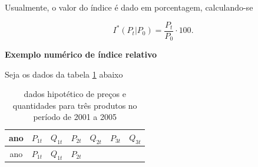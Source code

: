 \documentclass[
]{book}
\begin{document}
Usualmente, o valor do índice é dado em porcentagem, calculando-se

\begin{equation}
  I^*(P_t| P_0) = \frac{P_t}{P_0}\cdot 100.
  \label{eq:IndicePrecoRelativoPorcentagem}
\end{equation}

\textbf{Exemplo numérico de índice relativo}

Seja os dados da tabela \ref{tab:DadosPrecosQuantidadesDeTresProdutos2001a2005} abaixo

\begin{longtable}[]{@{}ccccccc@{}}
\caption{\label{tab:DadosPrecosQuantidadesDeTresProdutos2001a2005} dados hipotético de preços e quantidades para três produtos no período de 2001 a 2005}\tabularnewline
\toprule
\begin{minipage}[b]{0.08\columnwidth}\centering
ano\strut
\end{minipage} & \begin{minipage}[b]{0.12\columnwidth}\centering
\(P_{1t}\)\strut
\end{minipage} & \begin{minipage}[b]{0.12\columnwidth}\centering
\(Q_{1t}\)\strut
\end{minipage} & \begin{minipage}[b]{0.12\columnwidth}\centering
\(P_{2t}\)\strut
\end{minipage} & \begin{minipage}[b]{0.12\columnwidth}\centering
\(Q_{2t}\)\strut
\end{minipage} & \begin{minipage}[b]{0.12\columnwidth}\centering
\(P_{3t}\)\strut
\end{minipage} & \begin{minipage}[b]{0.12\columnwidth}\centering
\(Q_{3t}\)\strut
\end{minipage}\tabularnewline
\midrule
\endfirsthead
\toprule
\begin{minipage}[b]{0.08\columnwidth}\centering
ano\strut
\end{minipage} & \begin{minipage}[b]{0.12\columnwidth}\centering
\(P_{1t}\)\strut
\end{minipage} & \begin{minipage}[b]{0.12\columnwidth}\centering
\(Q_{1t}\)\strut
\end{minipage} & \begin{minipage}[b]{0.12\columnwidth}\centering
\(P_{2t}\)\strut
\end{minipage} & \begin{minipage}[b]{0.12\columnwidth}\centering

\end{minipage}
\end{longtable}
\end{document}
